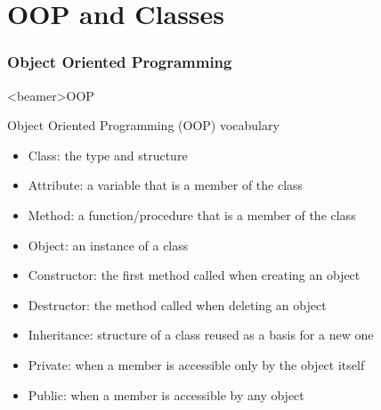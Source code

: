 
\part{OOP and Classes}  %



\section{Object Oriented Programming}

\begin{frame}<beamer>{OOP}

  Object Oriented Programming (OOP) vocabulary

  \begin{itemize}
    \item<2-> Class: the type and structure
    \item<3-> Attribute: a variable that is a member of the class
    \item<4-> Method: a function/procedure that is a member of the class
  \end{itemize}

  \begin{itemize}
    \item<5-> Object: an instance of a class
    \item<6-> Constructor: the first method called when creating an object
    \item<7-> Destructor: the method called when deleting an object
  \end{itemize}

  \begin{itemize}
    \item<8-> Inheritance: structure of a class reused as a basis for a new one
    \item<9-> Private: when a member is accessible only by the object itself
    \item<10-> Public: when a member is accessible by any object
  \end{itemize}

\end{frame}


